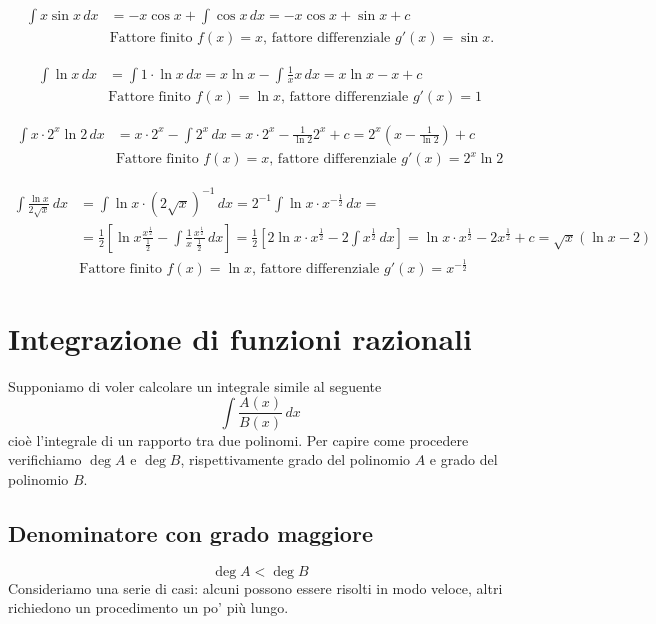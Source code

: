 \documentclass[11pt]{article}
\begin{document}
\begin{align*}\int x \sin x \, dx &= -x\cos x + \int \cos x \,dx=-x\cos x+\sin x + c\\&\text{Fattore finito $f(x)=x$, fattore differenziale $g'(x)=\sin x$.}\end{align*}

\begin{align*} \int \ln x \, dx &= \int 1 \cdot \ln x \, dx = x \ln x - \int \frac{1}{x}x \, dx=x \ln x - x + c\\&\text{Fattore finito $f(x)=\ln x$, fattore differenziale $g'(x)=1$}\end{align*}

\begin{align*} \int x \cdot 2^x \ln 2\, dx &= x \cdot 2^x - \int 2^x\,dx=x \cdot 2^x - \frac{1}{\ln 2}2^x+c=2^x\left(x-\frac{1}{\ln 2}\right)+c\\&\text{Fattore finito $f(x)=x$, fattore differenziale $g'(x)=2^x \ln 2$}\end{align*}

\begin{align*}  \int \frac{\ln x}{2\sqrt{x}}\,dx&=\int \ln x \cdot (2\sqrt{x})^{-1}\,dx=2^{-1} \int \ln x \cdot x^{-\frac{1}{2}}\, dx=\\&=\frac{1}{2}\left[\ln x \frac{x^{\frac{1}{2}}}{\frac{1}{2}}- \int \frac{1}{x} \frac{x^{\frac{1}{2}}}{\frac{1}{2}}\,dx	\right] =\frac{1}{2}\left[2\ln x \cdot x^{\frac{1}{2}} - 2\int  x^{\frac{1}{2}}\,dx	\right]=\ln x \cdot  x^{\frac{1}{2}}-2 x^{\frac{1}{2}} + c=\sqrt{x}\left(\ln x - 2\right)\\&\text{Fattore finito $f(x)=\ln x$, fattore differenziale $g'(x)=x^{-\frac{1}{2}}$}\end{align*}
\clearpage

\section{Integrazione di funzioni razionali}
Supponiamo di voler calcolare un integrale simile al seguente
\[\int\frac{A(x)}{B(x)}\,dx\]
cioè l'integrale di un rapporto tra due polinomi. Per capire come procedere verifichiamo $\deg A$ e $\deg B$, rispettivamente grado del polinomio $A$ e grado del polinomio $B$. 
\subsection{Denominatore con grado maggiore}
\[\boxed{\deg A < \deg B}\]
Consideriamo una serie di casi: alcuni possono essere risolti in modo veloce, altri richiedono un procedimento un po' più lungo.
\end{document}
